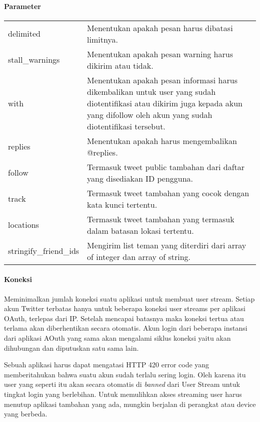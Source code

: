 \paragraph{Parameter}
\begin{table}[h]
\begin{tabular}{|l|l|}
delimited              & Menentukan apakah pesan harus dibatasi limitnya.																																					\\
stall\_warnings        & Menentukan apakah pesan warning harus dikirim atau tidak.                                                                        \\
with                   & Menentukan apakah pesan informasi harus dikembalikan untuk user yang sudah diotentifikasi atau dikirim juga kepada akun yang difollow oleh akun yang sudah diotentifikasi tersebut.\\
replies                & Menentukan apakah harus mengembalikan @replies.                                                                             \\
follow                 & Termasuk tweet public tambahan dari daftar yang disediakan ID pengguna.														\\
track                  & Termasuk tweet tambahan yang cocok dengan kata kunci tertentu.     \\
locations              & Termasuk tweet tambahan yang termasuk dalam batasan lokasi tertentu.                                                      \\
stringify\_friend\_ids & Mengirim list teman yang diterdiri dari array of integer dan array of string.                          
\end{tabular}
\end{table}

\paragraph{Koneksi}
Meminimalkan jumlah koneksi suatu aplikasi untuk membuat user stream. Setiap akun Twitter terbatas hanya untuk beberapa koneksi user streams per aplikasi OAuth, terlepas dari IP. Setelah mencapai batasnya maka koneksi tertua atau terlama akan diberhentikan secara otomatis. Akun login dari beberapa instansi dari aplikasi AOuth yang sama akan mengalami siklus koneksi yaitu akan dihubungan dan diputuskan satu sama lain.

Sebuah aplikasi harus dapat mengatasi HTTP 420 error code yang memberitahukan bahwa suatu akun sudah terlalu sering login. Oleh karena itu user yang seperti itu akan secara otomatis di \textit{banned} dari User Stream untuk tingkat login yang berlebihan. Untuk memulihkan akses streaming user harus menutup aplikasi tambahan yang ada, mungkin berjalan di perangkat atau device yang berbeda.

